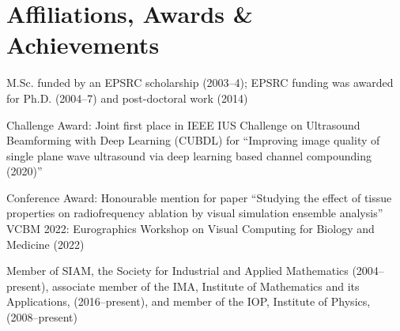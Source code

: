 \documentclass[11pt, a4paper]{awesome-cv}
\begin{document}
\hypertarget{Awards, affiliations, achievements}{\section{Affiliations, Awards \& Achievements}\label{awards}}
%
\begin{cventries}
%

{}
{}
{\vspace*{-0.5cm}
\begin{cvitems}%
\item M.Sc. funded by an EPSRC scholarship (2003--4); EPSRC funding was awarded for Ph.D. (2004--7) and post-doctoral work (2014)
\end{cvitems}}

{}
{}
{\vspace*{-0.5cm}
\begin{cvitems}
\item Challenge Award: Joint first place in IEEE IUS Challenge on Ultrasound Beamforming with Deep Learning (CUBDL) for \enquote{Improving image quality of single plane wave ultrasound via deep learning based channel compounding (2020)}
\item Conference Award: Honourable mention for paper \enquote{Studying the effect of tissue properties on radiofrequency ablation by visual simulation ensemble analysis} VCBM 2022: Eurographics Workshop on Visual Computing for Biology and Medicine (2022)
\end{cvitems}}

{}
{}
{\vspace*{-0.5cm}
\begin{cvitems}%
\item Member of SIAM, the Society for Industrial and Applied Mathematics (2004--present), associate member of the IMA, Institute of Mathematics and its Applications, \mbox{(2016--present)}, and member of the IOP, Institute of Physics, (2008--present)
\end{cvitems}}


\end{cventries}
\end{document}
